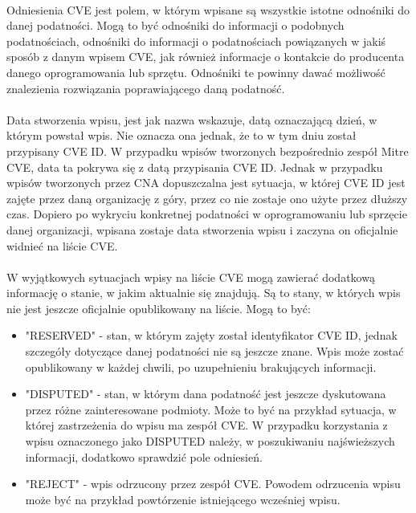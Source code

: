 \documentclass[a4paper,12pt,twoside]{article}
\begin{document}
\paragraph{}
Odniesienia CVE jest polem, w którym wpisane są wszystkie istotne odnośniki do danej podatności. Mogą to być odnośniki do informacji o podobnych podatnościach, odnośniki do informacji o podatnościach powiązanych w jakiś sposób z danym wpisem CVE, jak również informacje o kontakcie do producenta danego oprogramowania lub sprzętu. Odnośniki te powinny dawać możliwość znalezienia rozwiązania poprawiającego daną podatność. 
\paragraph{}
Data stworzenia wpisu, jest jak nazwa wskazuje, datą oznaczającą dzień, w którym powstał wpis. Nie oznacza ona jednak, że to w tym dniu został przypisany CVE ID. W przypadku wpisów tworzonych bezpośrednio zespół Mitre CVE, data ta pokrywa się z datą przypisania CVE ID. Jednak w przypadku wpisów tworzonych przez CNA dopuszczalna jest sytuacja, w której CVE ID jest zajęte przez daną organizację z góry, przez co nie zostaje ono użyte przez dłuższy czas. Dopiero po wykryciu konkretnej podatności w oprogramowaniu lub sprzęcie danej organizacji, wpisana zostaje data stworzenia wpisu i zaczyna on oficjalnie widnieć na liście CVE.
\paragraph{}
W wyjątkowych sytuacjach wpisy na liście CVE mogą zawierać dodatkową informację o stanie, w jakim aktualnie się znajdują. Są to stany, w których wpis nie jest jeszcze oficjalnie opublikowany na liście. Mogą to być:
\begin{itemize}
\item "RESERVED" - stan, w którym zajęty został identyfikator CVE ID, jednak szczegóły dotyczące danej podatności nie są jeszcze znane. Wpis może zostać opublikowany w każdej chwili, po uzupełnieniu brakujących informacji.
\item "DISPUTED" - stan, w którym dana podatność jest jeszcze dyskutowana przez różne zainteresowane podmioty. Może to być na przykład sytuacja, w której zastrzeżenia do wpisu ma zespół CVE. W przypadku korzystania z wpisu oznaczonego jako DISPUTED należy, w poszukiwaniu najświeższych informacji, dodatkowo sprawdzić pole odniesień.
\item "REJECT" - wpis odrzucony przez zespół CVE. Powodem odrzucenia wpisu może być na przykład powtórzenie istniejącego wcześniej wpisu.
\end{itemize}
\end{document}
